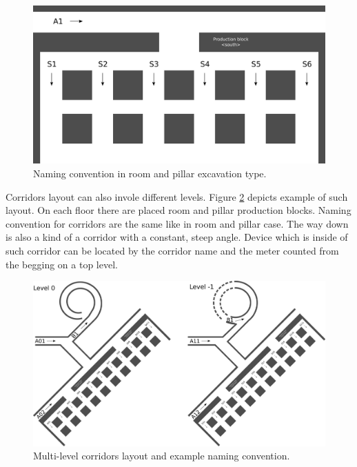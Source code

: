 \documentclass[../main.tex]{subfiles}
\begin{document}
\begin{figure}[ht]
\includegraphics[width=\textwidth]{pictures/room_and_pillar_scheme.pdf}
\centering
\caption{Naming convention in room and pillar excavation type.}
\label{fig:room_and_pillar_scheme}
\end{figure}

Corridors layout can also invole different levels. Figure \ref{fig:mine_with_levels_scheme} depicts example of such layout. On each floor there are placed room and pillar production blocks. Naming convention for corridors are the same like in room and pillar case. The way down is also a kind of a corridor with a constant, steep angle. Device which is inside of such corridor can be located by the corridor name and the meter counted from the begging on a top level.

\begin{figure}[ht]
\includegraphics[width=\textwidth]{pictures/mine_with_levels_scheme.pdf}
\centering
\caption{Multi-level corridors layout and example naming convention.}
\label{fig:mine_with_levels_scheme}
\end{figure}
\end{document}
